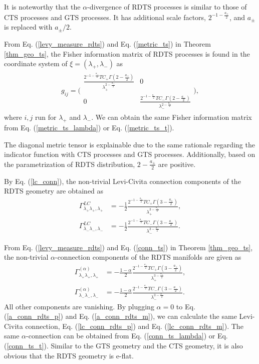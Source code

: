 \documentclass[preprint,11pt]{amsart}
\begin{document}
	It is noteworthy that the $\alpha$-divergence of RDTS processes is similar to those of CTS processes and GTS processes. It has additional scale factors, $2^{-1-\frac{a_\pm}{2}}$, and $a_{\pm}$ is replaced with $a_{\pm}/2$.

	From Eq. (\ref{levy_measure_rdts}) and Eq. (\ref{metric_ts}) in Theorem \ref{thm_geo_ts}, the Fisher information matrix of RDTS processes is found in the coordinate system of $\xi=(\lambda_+,\lambda_-)$ as
	\begin{align}
	\label{metric_rdts}
		g_{ij}=\Bigg(
		\begin{array}{cc}
			\frac{2^{-1-\frac{a_+}{2}}TC_+\Gamma(2-\frac{a_+}{2})}{\lambda_+^{2-\frac{a_+}{2}}} &0 \\ 
			0 & \frac{2^{-1-\frac{a_-}{2}}TC_-\Gamma(2-\frac{a_-}{2})}{\lambda_-^{2-\frac{a_-}{2}}}
		\end{array}\Bigg),
	\end{align}
	where $i, j$ run for $\lambda_+$ and $\lambda_-$. We can obtain the same Fisher information matrix from Eq. (\ref{metric_ts_lambda}) or Eq. (\ref{metric_ts_t}).
	
	The diagonal metric tensor is explainable due to the same rationale regarding the indicator function with CTS processes and GTS processes. Additionally, based on the parametrization of RDTS distribution, $2-\frac{a_{\pm}}{2}$ are positive.
	
	By Eq. (\ref{lc_conn}), the non-trivial Levi-Civita connection components of the RDTS geometry are obtained as
	\begin{align}
	\label{lc_conn_rdts_p}
		\Gamma^{LC}_{\lambda_+\lambda_+,\lambda_+}&=-\frac{1}{2}\frac{2^{-1-\frac{a_+}{2}}TC_+\Gamma(3-\frac{a_+}{2})}{\lambda_+^{3-\frac{a_+}{2}}},\\
	\label{lc_conn_rdts_m}
		\Gamma^{LC}_{\lambda_-\lambda_-,\lambda_-}&=-\frac{1}{2}\frac{2^{-1-\frac{a_-}{2}}TC_-\Gamma(3-\frac{a_-}{2})}{\lambda_-^{3-\frac{a_-}{2}}}.
	\end{align}

	From Eq. (\ref{levy_measure_rdts}) and Eq. (\ref{conn_ts}) in Theorem \ref{thm_geo_ts}, the non-trivial $\alpha$-connection components of the RDTS manifolds are given as
	\begin{align}
	\label{a_conn_rdts_p}
	\Gamma^{(\alpha)}_{\lambda_+\lambda_+,\lambda_+}&=
	-\frac{1-\alpha}{2}\frac{2^{-1-\frac{a_+}{2}}TC_+\Gamma(3-\frac{a_+}{2})}{ \lambda_+^{3-\frac{a_+}{2}}},\\
	\label{a_conn_rdts_m}
	\Gamma^{(\alpha)}_{\lambda_-\lambda_-,\lambda_-}&=
	-\frac{1-\alpha}{2}\frac{2^{-1-\frac{a_-}{2}}TC_-\Gamma(3-\frac{a_-}{2})}{ \lambda_-^{3-\frac{a_-}{2}}}.
	\end{align}
	All other components are vanishing. By plugging $\alpha=0$ to Eq. (\ref{a_conn_rdts_p}) and Eq. (\ref{a_conn_rdts_m}), we can calculate the same Levi-Civita connection, Eq. (\ref{lc_conn_rdts_p}) and Eq. (\ref{lc_conn_rdts_m}). The same $\alpha$-connection can be obtained from Eq. (\ref{conn_ts_lambda}) or Eq. (\ref{conn_ts_t}). Similar to the GTS geometry and the CTS geometry, it is also obvious that the RDTS geometry is e-flat.
\end{document}
